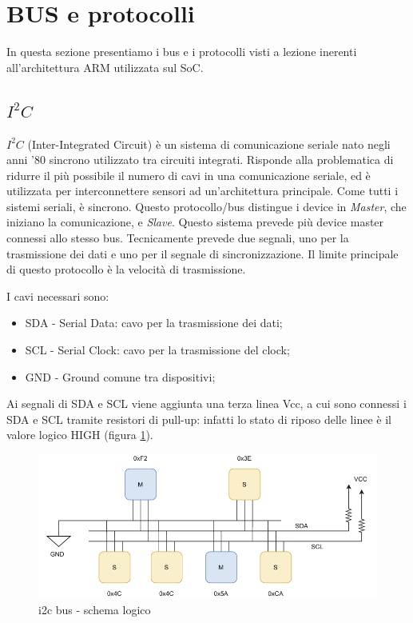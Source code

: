 \section{BUS e protocolli}
In questa sezione presentiamo i bus e i protocolli visti a lezione inerenti all'architettura ARM utilizzata sul SoC.

\subsection{$I^2 C$}
$I^2 C$ (Inter-Integrated Circuit) è un sistema di comunicazione seriale nato negli anni '80 sincrono utilizzato tra circuiti integrati. Risponde alla problematica di ridurre il più possibile il numero di cavi in una comunicazione seriale, ed è utilizzata per interconnettere sensori ad un'architettura principale. Come tutti i sistemi seriali, è sincrono. 
Questo protocollo/bus distingue i device in \textit{Master}, che iniziano la comunicazione, e \textit{Slave}. Questo sistema prevede più device master connessi allo stesso bus. Tecnicamente prevede due segnali, uno per la trasmissione dei dati e uno per il segnale di sincronizzazione. Il limite principale di questo protocollo è la velocità di trasmissione. 

I cavi necessari sono:
\begin{itemize}
    \item SDA - Serial Data: cavo per la trasmissione dei dati;
    \item SCL - Serial Clock: cavo per la trasmissione del clock;
    \item GND - Ground comune tra dispositivi;
\end{itemize}

Ai segnali di SDA e SCL viene aggiunta una terza linea Vcc, a cui sono connessi i SDA e SCL tramite resistori di pull-up: infatti lo stato di riposo delle linee è il valore logico HIGH (figura \ref{img:i2c_logic_1}).

\begin{figure}[ht]
    \centering
    \includegraphics[width=.7\textwidth]{img/i2c_1.png}
    \caption{i2c bus - schema logico}
    \label{img:i2c_logic_1}
\end{figure}

